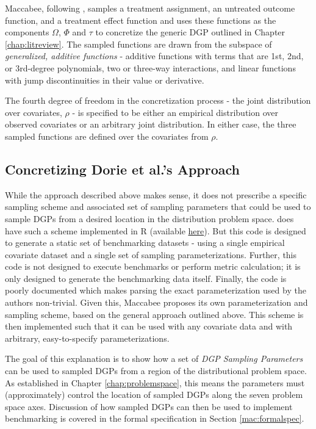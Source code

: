 \documentclass[../main.tex]{subfiles}
\begin{document}
Maccabee, following \textcite{Dorie2019Automated1}, samples a treatment assignment, an untreated outcome function, and a treatment effect function and uses these functions as the components $\Omega$, $\Phi$ and $\tau$ to concretize the generic DGP outlined in Chapter \ref{chap:litreview}. The sampled functions are drawn from the subspace of \textit{generalized, additive functions} - additive functions with terms that are 1st, 2nd, or 3rd-degree polynomials, two or three-way interactions, and linear functions with jump discontinuities in their value or derivative.

\vspace{\baselineskip}

The fourth degree of freedom in the concretization process - the joint distribution over covariates, $\rho$ - is specified to be either an empirical distribution over observed covariates or an arbitrary joint distribution. In either case, the three sampled functions are defined over the covariates from $\rho$.

\subsection{Concretizing Dorie et al.'s Approach}

While the approach described above makes sense, it does not prescribe a specific sampling scheme and associated set of sampling parameters that could be used to sample DGPs from a desired location in the distribution problem space. \textcite{Dorie2019Automated1} does have such a scheme implemented in R (available \href{https://github.com/vdorie/aciccomp}{here}). But this code is designed to generate a static set of benchmarking datasets - using a single empirical covariate dataset and a single set of sampling parameterizations. Further, this code is not designed to execute benchmarks or perform metric calculation; it is only designed to generate the benchmarking data itself. Finally, the code is poorly documented which makes parsing the exact parameterization used by the authors non-trivial. Given this, Maccabee proposes its own parameterization and sampling scheme, based on the general approach outlined above. This scheme is then implemented such that it can be used with any covariate data and with arbitrary, easy-to-specify parameterizations.

\vspace{\baselineskip}

The goal of this explanation is to show how a set of \textit{DGP Sampling Parameters} can be used to sampled DGPs from a region of the distributional problem space. As established in Chapter \ref{chap:problemspace}, this means the parameters must (approximately) control the location of sampled DGPs along the seven problem space axes. Discussion of how sampled DGPs can then be used to implement benchmarking is covered in the formal specification in Section \ref{mac:formalspec}.
\end{document}
